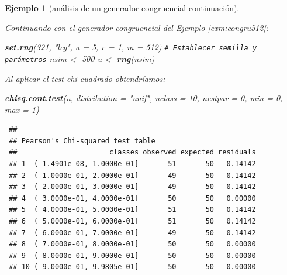 \documentclass[
  spanish,
  10pt,
]{book}
\newenvironment{Shaded}{\begin{snugshade}}{\end{snugshade}}
\newcommand{\AttributeTok}[1]{\textcolor[rgb]{0.13,0.29,0.53}{#1}}
\newcommand{\CommentTok}[1]{\textcolor[rgb]{0.56,0.35,0.01}{\textit{#1}}}
\newcommand{\DecValTok}[1]{\textcolor[rgb]{0.00,0.00,0.81}{#1}}
\newcommand{\FunctionTok}[1]{\textcolor[rgb]{0.13,0.29,0.53}{\textbf{#1}}}
\newcommand{\NormalTok}[1]{#1}
\newcommand{\OtherTok}[1]{\textcolor[rgb]{0.56,0.35,0.01}{#1}}
\newcommand{\StringTok}[1]{\textcolor[rgb]{0.31,0.60,0.02}{#1}}
\theoremstyle{break}
\newtheorem{example}{Ejemplo}[chapter]
\theoremstyle{nonumberplain}
\renewcommand{\CommentTok}[1]{\textcolor[rgb]{0.41,0.41,0.41}{\texttt{#1}}}
\begin{document}
\begin{example}[análisis de un generador congruencial continuación]
\protect\hypertarget{exm:congru512b}{}\label{exm:congru512b}

Continuando con el generador congruencial del Ejemplo \ref{exm:congru512}:

\begin{Shaded}
\begin{Highlighting}[]
\FunctionTok{set.rng}\NormalTok{(}\DecValTok{321}\NormalTok{, }\StringTok{"lcg"}\NormalTok{, }\AttributeTok{a =} \DecValTok{5}\NormalTok{, }\AttributeTok{c =} \DecValTok{1}\NormalTok{, }\AttributeTok{m =} \DecValTok{512}\NormalTok{)  }\CommentTok{\# Establecer semilla y parámetros}
\NormalTok{nsim }\OtherTok{\textless{}{-}} \DecValTok{500}
\NormalTok{u }\OtherTok{\textless{}{-}} \FunctionTok{rng}\NormalTok{(nsim)}
\end{Highlighting}
\end{Shaded}

Al aplicar el test chi-cuadrado obtendríamos:



\begin{Shaded}
\begin{Highlighting}[]
\FunctionTok{chisq.cont.test}\NormalTok{(u, }\AttributeTok{distribution =} \StringTok{"unif"}\NormalTok{, }
                \AttributeTok{nclass =} \DecValTok{10}\NormalTok{, }\AttributeTok{nestpar =} \DecValTok{0}\NormalTok{, }\AttributeTok{min =} \DecValTok{0}\NormalTok{, }\AttributeTok{max =} \DecValTok{1}\NormalTok{)}
\end{Highlighting}
\end{Shaded}

\begin{verbatim}
 ## 
 ## Pearson's Chi-squared test table
 ##                      classes observed expected residuals
 ## 1  (-1.4901e-08, 1.0000e-01]       51       50   0.14142
 ## 2  ( 1.0000e-01, 2.0000e-01]       49       50  -0.14142
 ## 3  ( 2.0000e-01, 3.0000e-01]       49       50  -0.14142
 ## 4  ( 3.0000e-01, 4.0000e-01]       50       50   0.00000
 ## 5  ( 4.0000e-01, 5.0000e-01]       51       50   0.14142
 ## 6  ( 5.0000e-01, 6.0000e-01]       51       50   0.14142
 ## 7  ( 6.0000e-01, 7.0000e-01]       49       50  -0.14142
 ## 8  ( 7.0000e-01, 8.0000e-01]       50       50   0.00000
 ## 9  ( 8.0000e-01, 9.0000e-01]       50       50   0.00000
 ## 10 ( 9.0000e-01, 9.9805e-01]       50       50   0.00000
\end{verbatim}


\end{example}
\end{document}
